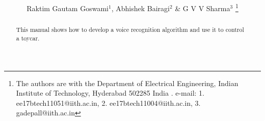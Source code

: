 \documentclass[journal,12pt,twocolumn]{IEEEtran}
\begin{document}
\def\putbox#1#2#3{\makebox[0in][l]{\makebox[#1][l]{}\raisebox{\baselineskip}[0in][0in]{\raisebox{#2}[0in][0in]{#3}}}}
     \def\rightbox#1{\makebox[0in][r]{#1}}
     \def\centbox#1{\makebox[0in]{#1}}
     \def\topbox#1{\raisebox{-\baselineskip}[0in][0in]{#1}}
     \def\midbox#1{\raisebox{-0.5\baselineskip}[0in][0in]{#1}}

\vspace{3cm}

\title{ 
}
\author{Raktim Gautam Goswami$^{1}$, Abhishek Bairagi$^{2}$ \& G V V Sharma$^{3}$ 
\thanks{The authors are with the Department
of Electrical Engineering, Indian Institute of Technology, Hyderabad
502285 India .  e-mail: 1. ee17btech11051@iith.ac.in, 2. ee17btech11004@iith.ac.in,  
3. gadepall@iith.ac.in}%
}




\maketitle


\tableofcontents

\renewcommand{\thefigure}{\theenumi}
\renewcommand{\thetable}{\theenumi}


\bigskip

\begin{abstract}
%
This manual shows how to develop a voice recognition algorithm and use it to 
control a toycar. 
%
\end{abstract}
\end{document}
